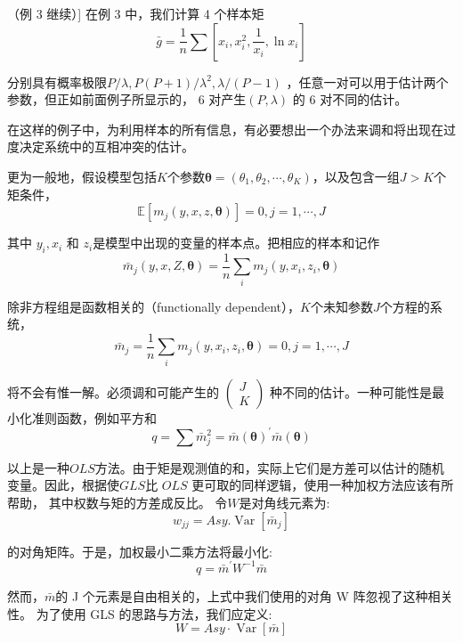 \begin{myexample}[[实例 4]（例 3 继续）]
    在例 3 中，我们计算 4 个样本矩
    $$ \bar{g}=\frac{1}{n} \sum\left[x_{i}, x_{i}^{2}, \frac{1}{x_{i}}, \ln x_{i}\right] $$

    分别具有概率极限$ P / \lambda, P(P+1) / \lambda^{2}, \lambda /(P-1) $ ，任意一对可以用于估计两个参数，但正如前面例子所显示的， 6 对产生$(P,\lambda)$ 的 6 对不同的估计。

    在这样的例子中，为利用样本的所有信息，有必要想出一个办法来调和将出现在过度决定系统中的互相冲突的估计。

    更为一般地，假设模型包括$ K $个参数$ \boldsymbol{\theta} = \left(\theta_{1}, \theta_{2}, \cdots, \theta_{K}\right) $，以及包含一组$ J > K $个矩条件，
    $$ \mathbb{E}\left[m_{j}(y, x, z, \boldsymbol{\theta})\right]=0, j=1, \cdots, J $$

    其中 $ y_{i}, x_{i}$   和 $ z_{i} $是模型中出现的变量的样本点。把相应的样本和记作
    $$ \bar{m}_{j}(y, x, Z, \boldsymbol{\theta})=\frac{1}{n} \sum_{i} m_{j}\left(y, x_{i}, z_{i}, \boldsymbol{\theta} \right) $$

    除非方程组是函数相关的（functionally dependent），$ K $个未知参数$ J $个方程的系统，
    $$ \bar{m}_{j}=\frac{1}{n} \sum_{i} m_{j}\left(y, x_{i}, z_{i}, \boldsymbol{\theta} \right)=0, j=1, \cdots, J $$

    将不会有惟一解。必须调和可能产生的
    $ \left(\begin{array}{l}
        J \\K
        \end{array}\right) $ 种不同的估计。一种可能性是最小化准则函数，例如平方和
        \begin{equation}
            q=\sum \bar{m}_{j}^{2}=\bar{m}(\boldsymbol{\theta})^{\prime} \bar{m}(\boldsymbol{\theta})
            \label{eq 10.5.1}
        \end{equation}

        以上是一种$ OLS $方法。由于矩是观测值的和，实际上它们是方差可以估计的随机变量。因此，根据使$ GLS $比 $ OLS$ 更可取的同样逻辑，使用一种加权方法应该有所帮助，
         其中权数与矩的方差成反比。 令$ W $是对角线元素为:
         $$ w_{j j}=Asy.\operatorname{Var}\left[\bar{m}_{j}\right] $$
 

         的对角矩阵。于是，加权最小二乘方法将最小化:
         $$ q=\bar{m}^{\prime} W^{-1} \bar{m} $$
        
         然而，$ \bar{m} $的 J 个元素是自由相关的，上式中我们使用的对角 W 阵忽视了这种相关性。 为了使用 GLS 的思路与方法，我们应定义:
         \begin{equation}
            W=Asy\cdot \operatorname{Var}[\bar{m}]
            \label{eq 10.5.2}
         \end{equation}


\end{myexample}
